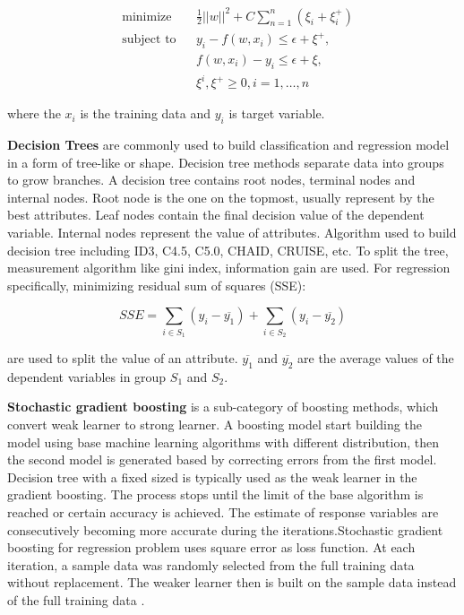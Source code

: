 \documentclass[12pt,english]{report}
\begin{document}
\begin{equation}
    \begin{aligned}
     &   \text{minimize}
     & & \frac{1}{2} {||w||^2} + C \sum_{n=1}^{n}(\xi_i + \xi_i^+) \\
     & \text{subject to} 
     & & y_{i} - f(w,x_i) \leq  \epsilon + \xi^+, \\
     &&& f(w,x_i) - y_{i} \leq \epsilon + \xi, \\
     &&& \xi^i, \xi^+ \geq 0, i=1,\dots,n
    \end{aligned}
\end{equation}

where the $x_i$ is the training data and $y_i$ is target variable.


\textbf{Decision Trees} are commonly used to build classification and
regression model in a form of tree-like or shape. Decision tree methods
separate data into groups to grow branches. A decision tree contains root nodes,
terminal nodes and internal nodes. Root node is the one on the topmost, usually
represent by the best attributes. Leaf nodes contain the final decision value
of the dependent variable. Internal nodes represent the value of attributes.
Algorithm used to build decision tree including ID3, C4.5, C5.0, CHAID, CRUISE,
etc. To split the tree, measurement algorithm like gini index, information gain
are used. For regression specifically, minimizing  residual sum of squares
(SSE):

\begin{equation}
	SSE = \sum_{i \in S_1} (y_i - \overline{y_1}) + \sum_{i \in S_2} (y_i -
	\overline{y_2})
\end{equation}

are used to split the value of an attribute. $\overline{y_1}$ and
$\overline{y_2}$ are the average values of the dependent variables in group
$S_1$ and $S_2$. 


\textbf{Stochastic gradient boosting} is a sub-category of boosting methods,
which convert weak learner to strong learner. A boosting model start building
the model using base machine learning algorithms with different distribution,
then the second model is generated based by correcting errors from the first
model. Decision tree with a fixed sized is typically used as the weak learner
in the gradient boosting.
The process stops until the limit of the base algorithm is reached or
certain accuracy is achieved. The estimate of response variables are 
consecutively becoming more accurate during the iterations.Stochastic gradient
boosting for regression problem uses square error as loss function. At each
iteration, a sample data was randomly selected from the full training data
without replacement. The weaker learner then is built on the sample data
instead of the full training data \citep{FRIEDMAN2002367}. 
\end{document}
